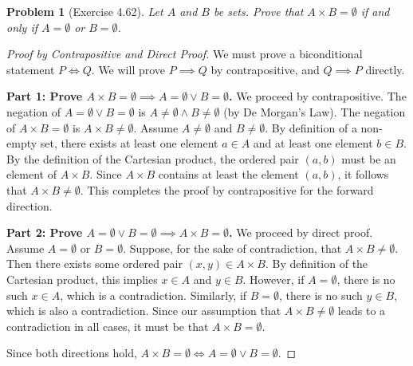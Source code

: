 \documentclass[11pt]{article}
\newtheorem{problem}{Problem}
\begin{document}
\begin{problem}[Exercise 4.62]
Let $A$ and $B$ be sets. Prove that $A \times B = \emptyset$ if and only if $A = \emptyset$ or $B = \emptyset$.
\end{problem}
\begin{proof}[Proof by Contrapositive and Direct Proof]
We must prove a biconditional statement $P \iff Q$. We will prove $P \implies Q$ by contrapositive, and $Q \implies P$ directly.

\textbf{Part 1: Prove $A \times B = \emptyset \implies A = \emptyset \lor B = \emptyset$.}
We proceed by contrapositive. The negation of $A = \emptyset \lor B = \emptyset$ is $A \neq \emptyset \land B \neq \emptyset$ (by De Morgan's Law). The negation of $A \times B = \emptyset$ is $A \times B \neq \emptyset$.
Assume $A \neq \emptyset$ and $B \neq \emptyset$. 
By definition of a non-empty set, there exists at least one element $a \in A$ and at least one element $b \in B$. 
By the definition of the Cartesian product, the ordered pair $(a, b)$ must be an element of $A \times B$. 
Since $A \times B$ contains at least the element $(a, b)$, it follows that $A \times B \neq \emptyset$. 
This completes the proof by contrapositive for the forward direction.

\textbf{Part 2: Prove $A = \emptyset \lor B = \emptyset \implies A \times B = \emptyset$.}
We proceed by direct proof. Assume $A = \emptyset$ or $B = \emptyset$. 
Suppose, for the sake of contradiction, that $A \times B \neq \emptyset$. 
Then there exists some ordered pair $(x, y) \in A \times B$. 
By definition of the Cartesian product, this implies $x \in A$ and $y \in B$. 
However, if $A = \emptyset$, there is no such $x \in A$, which is a contradiction. 
Similarly, if $B = \emptyset$, there is no such $y \in B$, which is also a contradiction. 
Since our assumption that $A \times B \neq \emptyset$ leads to a contradiction in all cases, it must be that $A \times B = \emptyset$.

Since both directions hold, $A \times B = \emptyset \iff A = \emptyset \lor B = \emptyset$.
\end{proof}
\end{document}
